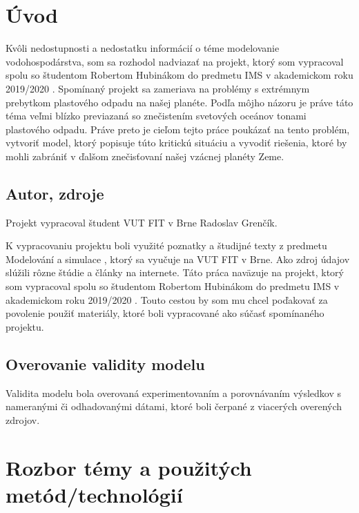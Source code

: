 \documentclass[a4paper, 11pt]{article}
\begin{document}
\section{Úvod}

Kvôli nedostupnosti a nedostatku informácií o téme modelovanie vodohospodárstva, som sa rozhodol nadviazať na projekt, ktorý som vypracoval spolu so študentom Robertom Hubinákom do predmetu IMS v akademickom roku 2019/2020 \cite{IMS_project}. Spomínaný projekt sa zameriava na problémy s extrémnym prebytkom plastového odpadu na našej planéte. Podľa môjho názoru je práve táto téma veľmi blízko previazaná so znečistením svetových oceánov tonami plastového odpadu. Práve preto je cieľom tejto práce poukázať na tento problém, vytvoriť model, ktorý popisuje túto kritickú situáciu a vyvodiť riešenia, ktoré by mohli zabrániť v ďalšom znečisťovaní našej vzácnej planéty Zeme.

\subsection{Autor, zdroje}

Projekt vypracoval študent VUT FIT v Brne Radoslav Grenčík.

K vypracovaniu projektu boli využité poznatky a študijné texty z predmetu Modelování a simulace \cite{IMS_slides}, ktorý sa vyučuje na VUT FIT v Brne. Ako zdroj údajov slúžili rôzne štúdie a články na internete. Táto práca naväzuje na projekt, ktorý som vypracoval spolu so študentom Robertom Hubinákom do predmetu IMS v akademickom roku 2019/2020 \cite{IMS_project}. Touto cestou by som mu chcel poďakovať za povolenie použiť materiály, ktoré boli vypracované ako súčasť spomínaného projektu.

\subsection{Overovanie validity modelu}

Validita modelu bola overovaná experimentovaním a porovnávaním výsledkov s nameranými či odhadovanými dátami, ktoré boli čerpané z viacerých overených zdrojov.

\pagebreak
\section{Rozbor témy a použitých metód/technológií}
\label{tema:uvod}
\end{document}
